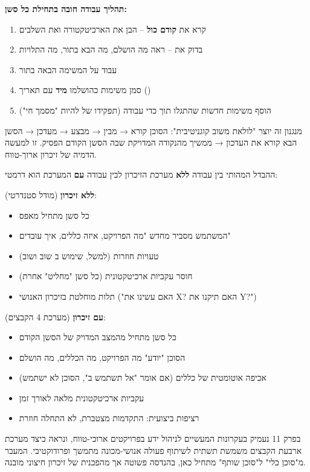 \textbf{תהליך עבודה חובה בתחילת כל סשן:}
\begin{enumerate}
  \item קרא את  \textbf{קודם כול} – הבן את הארכיטקטורה ואת השלבים
  \item בדוק את  – ראה מה הושלם, מה הבא בתור, מה התלויות
  \item עבוד על המשימה הבאה בתור
  \item סמן משימות כהושלמו \textbf{מיד} עם תאריך ()
  \item הוסף משימות חדשות שהתגלו תוך כדי עבודה (תפקידו של  להיות "מסמך חי")
\end{enumerate}

מנגנון זה יוצר "לולאת משוב קוגניטיבית": הסוכן קורא → מבין → מבצע → מעדכן → הסשן הבא קורא את העדכון → ממשיך מהנקודה המדויקת שבה הסשן הקודם הפסיק. זו למעשה הדמיה של זיכרון ארוך-טווח.


ההבדל המהותי בין עבודה \textbf{ללא} מערכת הזיכרון לבין עבודה \textbf{עם} המערכת הוא דרמטי:

\textbf{ללא זיכרון} (מודל סטנדרטי):
\begin{itemize}
  \item כל סשן מתחיל מאפס
  \item המשתמש מסביר מחדש "מה הפרויקט, איזה כללים, איך עובדים"
  \item טעויות חוזרות (למשל, שימוש ב שוב ושוב)
  \item חוסר עקביות ארכיטקטונית (כל סשן "מחליט" אחרת)
  \item תלות מוחלטת בזיכרון האנושי ("האם עשינו את X? האם תיקנו את Y?")
\end{itemize}

\textbf{עם זיכרון} (מערכת \num{4} הקבצים):
\begin{itemize}
  \item כל סשן מתחיל מהמצב המדויק של הסשן הקודם
  \item הסוכן "יודע" מה הפרויקט, מה הכללים, מה הושלם
  \item אכיפה אוטומטית של כללים (אם  אומר "אל תשתמש ב", הסוכן לא ישתמש)
  \item עקביות ארכיטקטונית מלאה לאורך זמן
  \item רציפות ביצועית: התקדמות מצטברת, לא התחלה חוזרת
\end{itemize}

בפרק \num{11} נעמיק בעקרונות המעשיים לניהול ידע בפרויקטים ארוכי-טווח, ונראה כיצד מערכת ארבעת הקבצים משמשת תשתית לשיתוף פעולה אנושי-מכונה מתמשך ופרודוקטיבי. המעבר מ"סוכן כלי" ל"סוכן שותף" מתחיל כאן, בהנדסה פשוטה אך מהפכנית של זיכרון חיצוני מובנה.
